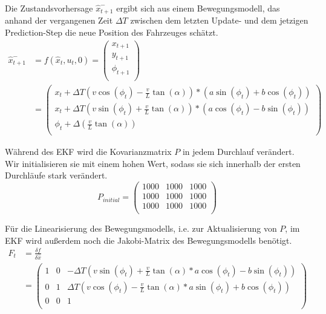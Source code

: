 \documentclass[11pt]{article}
\begin{document}
Die Zustandsvorhersage $\hat{x}_{t+1}^-$ ergibt sich aus einem Bewegungsmodell, das anhand der vergangenen Zeit $\Delta T$ zwischen dem letzten Update- und dem jetzigen Prediction-Step die neue Position des Fahrzeuges schätzt. 
\begin{equation}\label{EKF-Motion-Model}
\begin{split}
	\hat{x}_{t+1}^- &= f(\hat{x}_{t},u_t,0) = \begin{pmatrix}
		x_{t+1} \\
		y_{t+1} \\
		\phi_{t+1} \\
	  \end{pmatrix} \\
	  &= \begin{pmatrix}
		  x_{t}+\Delta T(v\cos(\phi_t)-\frac{v}{L}\tan(\alpha))*(a\sin(\phi_t)+b\cos(\phi_t)) \\
		  x_{t}+\Delta T(v\sin(\phi_t)+\frac{v}{L}\tan(\alpha))*(a\cos(\phi_t)-b\sin(\phi_t)) \\
		  \phi_t + \Delta(\frac{v}{L}\tan(\alpha)) \\
	  \end{pmatrix}
\end{split}
\end{equation}

Während des EKF wird die Kovarianzmatrix $P$ in jedem Durchlauf verändert. Wir initialisieren sie mit einem hohen Wert, sodass sie sich innerhalb der ersten Durchläufe stark verändert. 
\begin{equation}\label{EKF-Initiale-Kovarianzmatrix}
	P_{initial} = \begin{pmatrix}
		1000 & 1000 & 1000 \\
		1000 & 1000 & 1000 \\
		1000 & 1000 & 1000 \\
	  \end{pmatrix}
\end{equation}

Für die Linearisierung des Bewegungsmodells, i.e. zur Aktualisierung von $P$, im EKF wird außerdem noch die Jakobi-Matrix des Bewegungsmodells benötigt.
\begin{equation}\label{EKF-Motion-Model-Jakobi-Matrix}
\begin{split}
	F_t &= \frac{\delta f}{\delta \hat{x}} \\
	&= \begin{pmatrix}
		1 & 0 & -\Delta T(v\sin(\phi_t)+\frac{v}{L}\tan(\alpha)*a\cos(\phi_t)-b\sin(\phi_t)) \\
		0 & 1 & \Delta T(v\cos(\phi_t)-\frac{v}{L}\tan(\alpha)*a\sin(\phi_t)+b\cos(\phi_t)) \\
		0 & 0 & 1 \\
	  \end{pmatrix}
\end{split}
\end{equation}
\end{document}
